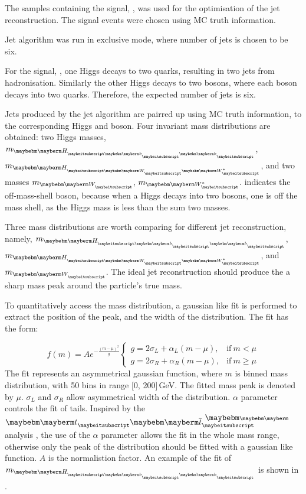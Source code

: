 The samples containing the signal, \eeToHHbbWWHad, was used for the optimisation of the jet reconstruction. The signal events were chosen using MC truth information.

Jet algorithm was run in exclusive mode, where number of jets is chosen to be six.

For the signal, \eeToHHbbWWHad, one Higgs decays to two \Pbottom quarks, resulting in two jets from hadronisation. Similarly the other Higgs decays to two \PW bosons, where each \PW boson decays into two quarks. Therefore, the expected number of jets is six.

Jets produced by the \kt jet algorithm are pairred up using MC truth information, to the corresponding Higgs and \PW boson. Four invariant mass distributions are obtained: two Higgs masses, $m_{\Hbb}$, $m_{\HWW}$, and two \PW masses $m_{\PW}$, $m_{\W*}$. \W* indicates the off-mass-shell \PW boson, because when a Higgs decays into two \PW bosons, one \PW is off the mass shell, as the Higgs mass is less than the sum two \PW masses.



Three mass distributions are worth comparing for different jet reconstruction, namely, $m_{\Hbb}$, $m_{\HWW}$, and $m_{\PW}$. The ideal jet reconstruction should produce the a sharp mass peak around the particle's true mass.

To quantitatively access the mass distribution, a gaussian like fit is performed to extract the position of the peak, and the width of the distribution. The fit has the form:

\begin{equation}
f(m)=A e^{- \frac{(m - \mu)^2}{g}}
\begin{cases}
  g = 2\sigma_L + \alpha_L(m - \mu), & \text{if}\ m < \mu\\
  g = 2\sigma_R + \alpha_R(m - \mu), & \text{if}\ m \geqslant \mu
\end{cases}
\end{equation}
The fit represents an asymmetrical gaussian function, where $m$ is binned mass distribution, with 50 bins in range [0, 200]\,GeV. The fitted mass peak is denoted by $\mu$. $\sigma_L$ and $\sigma_R$ allow asymmetrical width of the distribution. $\alpha$ parameter controls the fit of tails. Inspired by the $\Ptop\APtop$  analysis \cite{}, the use of the $\alpha$ parameter allows the fit in the whole mass range, otherwise only the peak of the distribution should be fitted with a gaussian like function. $A$ is the normalistion factor. An example of the fit of $m_{\Hbb}$ is shown in .

